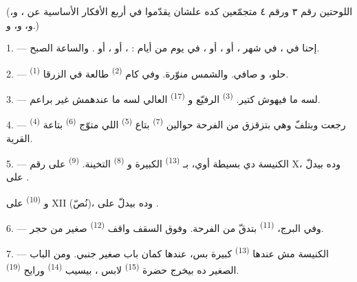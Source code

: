 (اللوحتين رقم ٣ ورقم ٤ متجمّعين كده علشان يقدّموا في أربع  الأفكار الأساسية عن ، و، و،
و، و.)

\VUsaut{4.0mm}
\VUsaut{3.0mm}

\VUsaut{2.4mm}

\VUsaut{3.0mm}

1. --- إحنا في ، في شهر ، أو ، أو
، في يوم من أيام : ، أو
، أو . والساعة  الصبح.

2. ---  حلو، و صافي. والشمس منوّرة. وفي كام
 \textsuperscript{(2)} طالعة في  الزرقا
\textsuperscript{(1)}.

3. ---  لسه ما فيهوش  كتير. 
\textsuperscript{(3)} الرفيّع و \textsuperscript{(17)} العالي لسه ما
عندهمش غير براعم.

4. ---  \textsuperscript{(4)} رجعت وبتلفّ وهي بتزقزق من
الفرحة حوالين  \textsuperscript{(7)} بتاع 
\textsuperscript{(5)} اللي متوّج  \textsuperscript{(6)} بتاعة القرية.

\VUsaut{3.4mm}
\VUsaut{3.0mm}

5. --- الكنيسة دي بسيطة أوي، بـ \textsuperscript{(13)} الكبيرة
و \textsuperscript{(8)} التخينة. 
\textsuperscript{(9)} على رقم X، وده بيدلّ على .

و \textsuperscript{(10)} على XII (نُصّ)، وده بيدلّ على
.

6. --- وفي البرج،  \textsuperscript{(11)} بتدقّ من الفرحة. وفوق
السقف واقف  \textsuperscript{(12)} صغير من حجر.

7. --- الكنيسة مش عندها  \textsuperscript{(13)} كبيرة بس، عندها كمان
باب صغير جنبي. ومن الباب الصغير ده بيخرج حضرة 
\textsuperscript{(15)} لابس ، بيسيب 
\textsuperscript{(14)} ورايح  \textsuperscript{(19)}.

